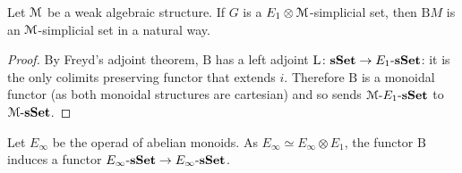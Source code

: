 \begin{refsection}
\begin{proposition}
Let $\mathcal{M}$ be a weak algebraic structure. If $G$ is a $E_1 \otimes \mathcal{M}$-simplicial set, then $\mathrm{B} M$ is an $\mathcal{M}$-simplicial set in a natural way.
\end{proposition}

\begin{proof}
By Freyd's adjoint theorem, $\mathrm{B}$ has a left adjoint $\mathrm{L} \colon \mathbf{s\,\!\mathbf{Set}} \to E_1 \textrm{-} \mathbf{s\,\!\mathbf{Set}}$: it is the only colimits preserving functor that extends $i$. Therefore $\mathrm{B}$ is a monoidal functor (as both monoidal structures are cartesian) and so sends $\mathcal{M} \textrm{-} E_1 \textrm{-} \mathbf{s\,\!\mathbf{Set}}$ to $\mathcal{M} \textrm{-} \mathbf{s\,\!\mathbf{Set}}$.
\end{proof}

\begin{corollary}
Let $E_{\infty}$ be the operad of abelian monoids. As $E_{\infty} \simeq E_{\infty} \otimes E_1$, the functor $\mathrm{B}$ induces a functor $E_{\infty} \textrm{-} \mathbf{s\,\!\mathbf{Set}} \to E_{\infty} \textrm{-} \mathbf{s\,\!\mathbf{Set}}$.
\end{corollary}

\printbibliography[heading = local]

\end{refsection}

\renewcommand{\thesection}{\thechapter.\arabic{section}}

